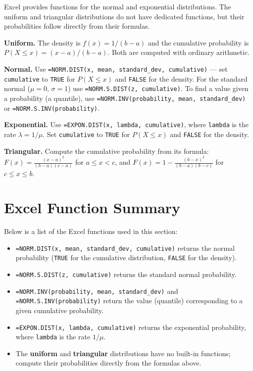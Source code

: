 \documentclass[
  11pt,
  letterpaper,
  DIV=11,
  numbers=noendperiod,
  oneside,
  open=any]{scrreprt}
\begin{document}
Excel provides functions for the normal and exponential distributions.
The uniform and triangular distributions do not have dedicated
functions, but their probabilities follow directly from their formulas.

\textbf{Uniform.} The density is \(f(x)=1/(b-a)\) and the cumulative
probability is \(P(X \le x)=(x-a)/(b-a)\). Both are computed with
ordinary arithmetic.

\textbf{Normal.} Use
\texttt{=NORM.DIST(x,\ mean,\ standard\_dev,\ cumulative)} --- set
\texttt{cumulative} to \texttt{TRUE} for \(P(X \le x)\) and
\texttt{FALSE} for the density. For the standard normal (\(\mu=0\),
\(\sigma=1\)) use \texttt{=NORM.S.DIST(z,\ cumulative)}. To find a value
given a probability (a quantile), use
\texttt{=NORM.INV(probability,\ mean,\ standard\_dev)} or
\texttt{=NORM.S.INV(probability)}.

\textbf{Exponential.} Use \texttt{=EXPON.DIST(x,\ lambda,\ cumulative)},
where \texttt{lambda} is the rate \(\lambda = 1/\mu\). Set
\texttt{cumulative} to \texttt{TRUE} for \(P(X \le x)\) and
\texttt{FALSE} for the density.

\textbf{Triangular.} Compute the cumulative probability from its
formula: \(F(x)=\frac{(x-a)^2}{(b-a)(c-a)}\) for \(a \le x < c\), and
\(F(x)=1-\frac{(b-x)^2}{(b-a)(b-c)}\) for \(c \le x \le b\).

\section{Excel Function Summary}\label{excel-function-summary-7}

Below is a list of the Excel functions used in this section:

\begin{itemize}
\item
  \texttt{=NORM.DIST(x,\ mean,\ standard\_dev,\ cumulative)} returns the
  normal probability (\texttt{TRUE} for the cumulative distribution,
  \texttt{FALSE} for the density).
\item
  \texttt{=NORM.S.DIST(z,\ cumulative)} returns the standard normal
  probability.
\item
  \texttt{=NORM.INV(probability,\ mean,\ standard\_dev)} and
  \texttt{=NORM.S.INV(probability)} return the value (quantile)
  corresponding to a given cumulative probability.
\item
  \texttt{=EXPON.DIST(x,\ lambda,\ cumulative)} returns the exponential
  probability, where \texttt{lambda} is the rate \(1/\mu\).
\item
  The \textbf{uniform} and \textbf{triangular} distributions have no
  built-in functions; compute their probabilities directly from the
  formulas above.
\end{itemize}
\end{document}
